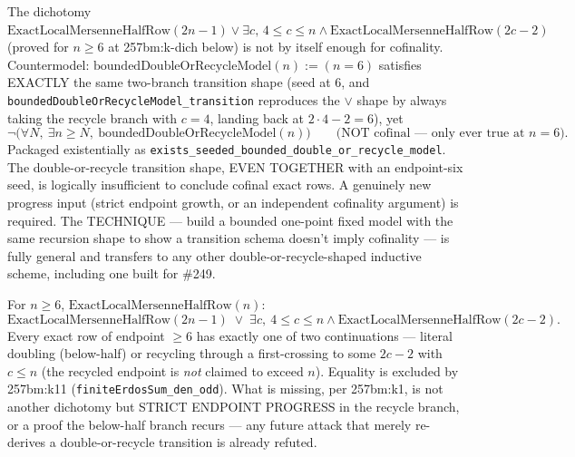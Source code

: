 \begin{thm}
The dichotomy $\mathrm{ExactLocalMersenneHalfRow}(2n{-}1) \vee \exists c,\,4\le c\le n\wedge
\mathrm{ExactLocalMersenneHalfRow}(2c{-}2)$ (proved for $n\ge6$ at 257bm:k-dich below) is not by
itself enough for cofinality. Countermodel: $\mathrm{boundedDoubleOrRecycleModel}(n) := (n=6)$
satisfies EXACTLY the same two-branch transition shape (seed at 6, and
\texttt{boundedDoubleOrRecycleModel\_transition} reproduces the $\vee$ shape by always taking
the recycle branch with $c=4$, landing back at $2\cdot4-2=6$), yet
\[
\neg\big(\forall N,\ \exists n\ge N,\ \mathrm{boundedDoubleOrRecycleModel}(n)\big) \qquad \text{(NOT cofinal — only ever true at } n=6\text{)}.
\]
Packaged existentially as \texttt{exists\_seeded\_bounded\_double\_or\_recycle\_model}. The
double-or-recycle transition shape, EVEN TOGETHER with an endpoint-six seed, is logically
insufficient to conclude cofinal exact rows. A genuinely new progress input (strict endpoint
growth, or an independent cofinality argument) is required. The TECHNIQUE — build a bounded
one-point fixed model with the same recursion shape to show a transition schema doesn't imply
cofinality — is fully general and transfers to any other double-or-recycle-shaped inductive
scheme, including one built for \#249.
\par\noindent{}      
\end{thm}

\begin{thm}
For $n\ge6$, $\mathrm{ExactLocalMersenneHalfRow}(n)$:
\[
\mathrm{ExactLocalMersenneHalfRow}(2n-1) \;\vee\; \exists c,\ 4\le c\le n \wedge \mathrm{ExactLocalMersenneHalfRow}(2c-2).
\]
Every exact row of endpoint $\ge6$ has exactly one of two continuations — literal doubling
(below-half) or recycling through a first-crossing to some $2c-2$ with $c\le n$ (the recycled
endpoint is \emph{not} claimed to exceed $n$). Equality is excluded by 257bm:k11
(\texttt{finiteErdosSum\_den\_odd}). What is
missing, per 257bm:k1, is not another dichotomy but STRICT ENDPOINT PROGRESS in the recycle
branch, or a proof the below-half branch recurs — any future attack that merely re-derives a
double-or-recycle transition is already refuted.
\par\noindent{}   
\end{thm}

